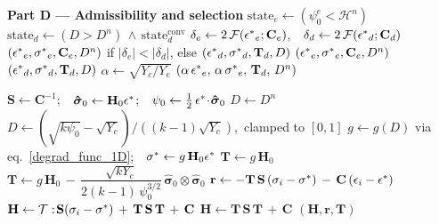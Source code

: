 \documentclass[10pt,review]{cas-sc}
\begin{document}
\begin{algorithm}[h]
\begin{algorithmic}[1]
		\Statex \textbf{Part D --- Admissibility and selection}
		\State $\mathrm{state}_e \gets (\psi_0^e < \mathcal{H}^n)$
		\State $\mathrm{state}_d \gets (D > D^n)\,\wedge\,\mathrm{state}_d^{\text{conv}}$
		\State $\delta_e \gets 2\,\mathcal{F}(\mbox{$\epsilon^*$}_e;\mathbf{C}_e)$,\ \ $\delta_d \gets 2\,\mathcal{F}(\mbox{$\epsilon^*$}_d;\mathbf{C}_d)$
		\State \Return $(\mbox{$\epsilon^*$}_e,\mbox{$\sigma^*$}_e,\mathbf{C}_e,D^n)$ if $|\delta_e|<|\delta_d|$, else $(\mbox{$\epsilon^*$}_d,\mbox{$\sigma^*$}_d,\mathbf{T}_d,D)$
		\State \Return $(\mbox{$\epsilon^*$}_e,\mbox{$\sigma^*$}_e,\mathbf{C}_e,D^n)$
		\State \Return $(\mbox{$\epsilon^*$}_d,\mbox{$\sigma^*$}_d,\mathbf{T}_d,D)$
		\Else
		\State $\alpha \gets \sqrt{Y_c/Y_e}$
		\State \Return $(\alpha\,\mbox{$\epsilon^*$}_e,\,\alpha\,\mbox{$\sigma^*$}_e,\,\mathbf{T}_d,\,D^n)$ 
		\EndIf
	\end{algorithmic}
	\caption{Material update with branch admissibility (per-Gauss-point)}
	\label{alg:material_update_detailed}
\end{algorithm}

\begin{algorithm}
	\begin{algorithmic}[1]
		\State $\mathbf{S}\gets\mathbf{C}^{-1}$;\ \ $\boldsymbol{\hat\sigma}_0 \gets \mathbf{H}_0\mbox{$\epsilon^*$}$;\ \ $\psi_0 \gets \tfrac12\,\mbox{$\epsilon^*$}\!\cdot\!\boldsymbol{\hat\sigma}_0$
		\State $D \gets D^n$
		\Else
		\State $D \gets (\sqrt{k\psi_0}-\sqrt{Y_c})/((k-1)\sqrt{Y_c})$,\ clamped to $[0,1]$
		\EndIf
		\State $g \gets g(D)$ via eq.~\eqref{degrad_func_1D};\ \ $\mbox{$\sigma^*$} \gets g\,\mathbf{H}_0\mbox{$\epsilon^*$}$
		\State $\mathbf{T} \gets g\,\mathbf{H}_0$ 
		\Else
		\State $\mathbf{T} \gets g\,\mathbf{H}_0\,-\,\dfrac{\sqrt{kY_c}}{2(k-1)\,\psi_0^{3/2}}\,\boldsymbol{\hat\sigma}_0\!\otimes\!\boldsymbol{\hat\sigma}_0$
		\EndIf
		\State $\mathbf{r} \gets -\mathbf{T}\,\mathbf{S}\,(\sigma_i-\mbox{$\sigma^*$})\,-\,\mathbf{C}\,(\epsilon_i-\mbox{$\epsilon^*$})$ 
		\State $\mathbf{H} \gets \mathcal{T}:\!\mathbf{S}(\sigma_i-\mbox{$\sigma^*$})\,+\,\mathbf{T}\,\mathbf{S}\,\mathbf{T}\,+\,\mathbf{C}$
		\Else
		\State $\mathbf{H} \gets \mathbf{T}\,\mathbf{S}\,\mathbf{T}\,+\,\mathbf{C}$
		\EndIf
		\State \Return $(\mathbf{H},\mathbf{r},\mathbf{T})$
		\EndProcedure
	\end{algorithmic}
	\caption{Residual and Hessian assembly for the material update Newton iteration.}
	\label{alg:assemble}
\end{algorithm}
\end{document}
